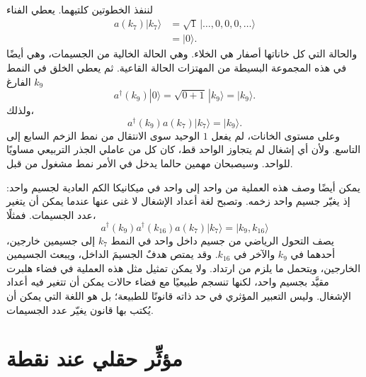 \begin{classroomqa}
\end{classroomqa}

لننفذ الخطوتين كلتيهما. يعطي الفناء
\begin{align}
a(k_7)|k_7\rangle
&=
\sqrt{1}\,|\ldots,0,0,0,\ldots\rangle\\
&=|0\rangle.
\end{align}
والحالة التي كل خاناتها أصفار هي الخلاء. وهي الحالة الخالية من الجسيمات، وهي أيضًا في هذه المجموعة البسيطة من المهتزات الحالة القاعية. ثم يعطي الخلق في النمط الفارغ \(k_9\)
\begin{equation}
a^\dagger(k_9)|0\rangle
=\sqrt{0+1}\,|k_9\rangle
=|k_9\rangle.
\end{equation}
ولذلك،
\begin{equation}
a^\dagger(k_9)a(k_7)|k_7\rangle=|k_9\rangle.
\end{equation}
وعلى مستوى الخانات، لم يفعل \(1\) الوحيد سوى الانتقال من نمط الزخم السابع إلى التاسع. ولأن أي إشغال لم يتجاوز الواحد قط، كان كل من عاملي الجذر التربيعي مساويًا للواحد. وسيصبحان مهمين حالما يدخل في الأمر نمط مشغول من قبل.

يمكن أيضًا وصف هذه العملية من واحد إلى واحد في ميكانيكا الكم العادية لجسيم واحد: إذ يغيّر جسيم واحد زخمه. وتصبح لغة أعداد الإشغال لا غنى عنها عندما يمكن أن يتغير عدد الجسيمات. فمثلًا،
\begin{equation}
a^\dagger(k_9)a^\dagger(k_{16})a(k_7)|k_7\rangle
=|k_9,k_{16}\rangle
\end{equation}
يصف التحول الرياضي من جسيم داخل واحد في النمط \(k_7\) إلى جسيمين خارجين، أحدهما في \(k_9\) والآخر في \(k_{16}\). وقد يمتص هدفٌ الجسيمَ الداخل، ويبعث الجسيمين الخارجين، ويتحمل ما يلزم من ارتداد. ولا يمكن تمثيل مثل هذه العملية في فضاء هلبرت مقيَّد بجسيم واحد، لكنها تنسجم طبيعيًا مع فضاء حالات يمكن أن تتغير فيه أعداد الإشغال. وليس التعبير المؤثري في حد ذاته قانونًا للطبيعة؛ بل هو اللغة التي يمكن أن يُكتب بها قانون يغيّر عدد الجسيمات.

\section{مؤثِّر حقلي عند نقطة}

